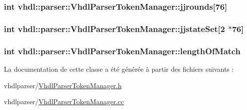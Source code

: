 \subsubsection[{jjrounds}]{\setlength{\rightskip}{0pt plus 5cm}int vhdl\+::parser\+::\+Vhdl\+Parser\+Token\+Manager\+::jjrounds\mbox{[}76\mbox{]}}\label{classvhdl_1_1parser_1_1_vhdl_parser_token_manager_aae221edf1aa2073c129cbc5e4909f531}
\hypertarget{classvhdl_1_1parser_1_1_vhdl_parser_token_manager_a99c4e00c6763674fb9279b74298acabf}{}
\subsubsection[{jjstate\+Set}]{\setlength{\rightskip}{0pt plus 5cm}int vhdl\+::parser\+::\+Vhdl\+Parser\+Token\+Manager\+::jjstate\+Set\mbox{[}2 $\ast$76\mbox{]}}\label{classvhdl_1_1parser_1_1_vhdl_parser_token_manager_a99c4e00c6763674fb9279b74298acabf}
\hypertarget{classvhdl_1_1parser_1_1_vhdl_parser_token_manager_a6d05b89884c43044653109f5cb9d7621}{}
\subsubsection[{length\+Of\+Match}]{\setlength{\rightskip}{0pt plus 5cm}int vhdl\+::parser\+::\+Vhdl\+Parser\+Token\+Manager\+::length\+Of\+Match}\label{classvhdl_1_1parser_1_1_vhdl_parser_token_manager_a6d05b89884c43044653109f5cb9d7621}


La documentation de cette classe a été générée à partir des fichiers suivants \+:\begin{DoxyCompactItemize}
\item 
vhdlparser/\hyperlink{_vhdl_parser_token_manager_8h}{Vhdl\+Parser\+Token\+Manager.\+h}\item 
vhdlparser/\hyperlink{_vhdl_parser_token_manager_8cc}{Vhdl\+Parser\+Token\+Manager.\+cc}\end{DoxyCompactItemize}
